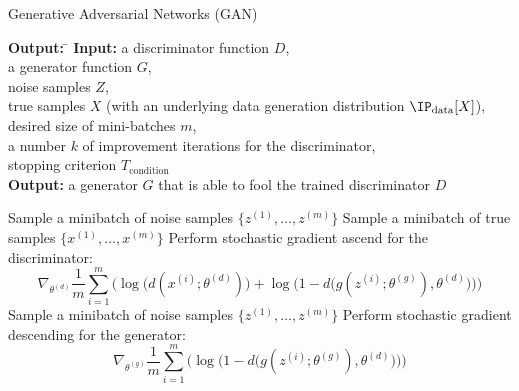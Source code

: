 \begin{algorithm}[H] 
	\caption{Generative Adversarial Networks (GAN)}%
	\begin{tabbing}
		\textbf{Output:} \= \kill
		\textbf{Input:} \> a discriminator function $D$,\\
		\> a generator function $G$,\\
		\> noise samples $Z$,\\
		\> true samples $X$ (with an underlying data generation distribution $\IP_{\text{data}}[X]$),\\
		\> desired size of mini-batches $m$,\\
		\> a number $k$ of improvement iterations for the discriminator,\\
		\> stopping criterion $T_{\text{condition}}$\\
		\textbf{Output:} \> a generator $G$ that is able to fool the trained discriminator $D$
	\end{tabbing}
	\begin{algorithmic}[1]
		\State Sample a minibatch of noise samples $\{z^{(1)}, \dots, z^{(m)}\}$
		\State Sample a minibatch of true samples $\{x^{(1)}, \dots, x^{(m)}\}$
		\State Perform stochastic gradient ascend for the discriminator:
		\[ \nabla_{\theta^{(d)}}\frac{1}{m}\sum\limits_{i=1}^{m}\Big( \log\big( d(x^{(i)};\theta^{(d)}) \big) + \log\big(1-d\big(g(z^{(i)};\theta^{(g)}),\theta^{(d)}\big)\big) \Big) \]
		\EndFor
		\State Sample a minibatch of noise samples $\{z^{(1)}, \dots, z^{(m)}\}$
		\State Perform stochastic gradient descending for the generator:
		\[ \nabla_{\theta^{(g)}}\frac{1}{m}\sum\limits_{i=1}^{m}\Big(  \log\big(1-d\big(g(z^{(i)};\theta^{(g)}),\theta^{(d)}\big)\big) \Big) \]
		\EndWhile
	\end{algorithmic}	
\end{algorithm}